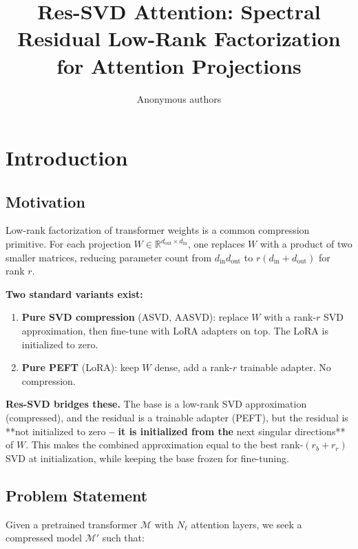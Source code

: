 \title{\textbf{Res-SVD Attention: Spectral Residual Low-Rank Factorization for Attention Projections}}

\author{Anonymous authors}


\section{Introduction}

\subsection{Motivation}

Low-rank factorization of transformer weights is a common compression 
primitive. For each projection $W \in \mathbb{R}^{d_\text{out} \times d_\text{in}}$, 
one replaces $W$ with a product of two smaller matrices, reducing parameter 
count from $d_\text{in} d_\text{out}$ to $r(d_\text{in} + d_\text{out})$ 
for rank $r$.

\textbf{Two standard variants exist:}

\begin{enumerate}
\item \textbf{Pure SVD compression} (ASVD, AASVD): replace $W$ with a rank-$r$ SVD
  approximation, then fine-tune with LoRA adapters on top. The LoRA is
  initialized to zero.
\item \textbf{Pure PEFT} (LoRA): keep $W$ dense, add a rank-$r$ trainable adapter.
  No compression.

\end{enumerate}
\textbf{Res-SVD bridges these.} The base is a low-rank SVD approximation (compressed), 
and the residual is a trainable adapter (PEFT), but the residual is **not 
initialized to zero\textbf{ -- it is initialized from the }next singular directions** 
of $W$. This makes the combined approximation equal to the best rank-$(r_b + r_r)$ 
SVD at initialization, while keeping the base frozen for fine-tuning.

\subsection{Problem Statement}

Given a pretrained transformer $\mathcal{M}$ with $N_\ell$ attention layers, 
we seek a compressed model $\mathcal{M}'$ such that:

